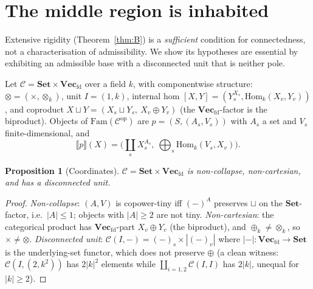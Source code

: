 \documentclass[11pt]{amsart}
\theoremstyle{plain}
\newtheorem{proposition}[theorem]{Proposition}
\theoremstyle{definition}
\newcommand{\C}{\mathcal{C}}
\newcommand{\Fam}{\mathrm{Fam}}
\newcommand{\ext}[1]{\llbracket #1 \rrbracket}
\newcommand{\Setb}{\mathbf{Set}}
\newcommand{\Vecfd}{\mathbf{Vec}_{\mathrm{fd}}}
\newcommand{\op}{\mathrm{op}}
\newcommand{\Hom}{\mathrm{Hom}}
\begin{document}
\section{The middle region is inhabited}\label{sec:middle}

Extensive rigidity (Theorem~\ref{thm:B}) is a \emph{sufficient} condition for connectedness, not a
characterisation of admissibility. We show its hypotheses are essential by exhibiting an admissible
base with a disconnected unit that is neither pole.

Let $\C=\Setb\times\Vecfd$ over a field $k$, with componentwise structure: $\otimes=(\times,\otimes_k)$,
unit $I=(1,k)$, internal hom $[X,Y]=(Y_s^{X_s},\Hom_k(X_v,Y_v))$, and coproduct
$X\sqcup Y=(X_s\sqcup Y_s,\ X_v\oplus Y_v)$ (the $\Vecfd$-factor is the biproduct). Objects of
$\Fam(\C^{\op})$ are $p=(S,(A_s,V_s))$ with $A_s$ a set and $V_s$ finite-dimensional, and
\[
   \ext p(X)=\Big(\coprod_{s} X_s^{A_s},\ \bigoplus_s\Hom_k(V_s,X_v)\Big).
\]

\begin{proposition}[Coordinates]\label{prop:coords}
$\C=\Setb\times\Vecfd$ is non-collapse, non-cartesian, and has a disconnected unit.
\end{proposition}
\begin{proof}
\emph{Non-collapse}: $(A,V)$ is copower-tiny iff $(-)^A$ preserves $\sqcup$ on the $\Setb$-factor,
i.e.\ $|A|\le 1$; objects with $|A|\ge2$ are not tiny. \emph{Non-cartesian}: the categorical product
has $\Vecfd$-part $X_v\oplus Y_v$ (the biproduct), and $\oplus_k\neq\otimes_k$, so $\times\neq\otimes$.
\emph{Disconnected unit}: $\C(I,-)=(-)_s\times|(-)_v|$ where $|-|:\Vecfd\to\Setb$ is the underlying-set
functor, which does not preserve $\oplus$ (a clean witness: $\C(I,(2,k^2))$ has $2|k|^2$ elements
while $\coprod_{i=1,2}\C(I,I)$ has $2|k|$, unequal for $|k|\ge2$).
\end{proof}
\end{document}
